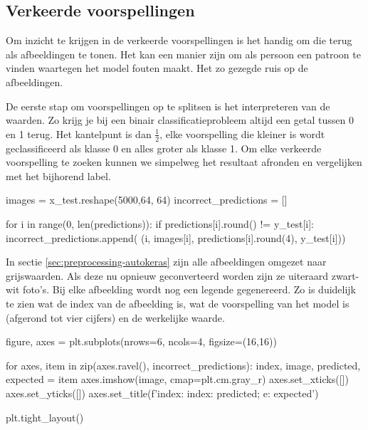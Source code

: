 \subsection{Verkeerde voorspellingen}
\label{subsec:wrong-predictions}

Om inzicht te krijgen in de verkeerde voorspellingen is het handig om die terug als afbeeldingen te tonen. Het kan een manier zijn om als persoon een patroon te vinden waartegen het model fouten maakt. Het zo gezegde ruis op de afbeeldingen. 

De eerste stap om voorspellingen op te splitsen is het interpreteren van de waarden. Zo krijg je bij een binair classificatieprobleem altijd een getal tussen 0 en 1 terug. Het kantelpunt is dan $\frac{1}{2}$, elke voorspelling die kleiner is wordt geclassificeerd als klasse 0 en alles groter als klasse 1. Om elke verkeerde voorspelling te zoeken kunnen we simpelweg het resultaat afronden en vergelijken met het bijhorend label.

\bigskip

\begin{python}
images = x_test.reshape(5000,64, 64)
incorrect_predictions = []

for i in range(0, len(predictions)):
    if predictions[i].round() != y_test[i]:
        incorrect_predictions.append(
            (i, images[i], predictions[i].round(4), y_test[i]))
\end{python}

In sectie \ref{sec:preprocessing-autokeras} zijn alle afbeeldingen omgezet naar grijswaarden. Als deze nu opnieuw geconverteerd worden zijn ze uiteraard zwart-wit foto's. Bij elke afbeelding wordt nog een legende gegenereerd. Zo is duidelijk te zien wat de index van de afbeelding is, wat de voorspelling van het model is (afgerond tot vier cijfers) en de werkelijke waarde.

\bigskip

\begin{python}

figure, axes = plt.subplots(nrows=6, ncols=4, figsize=(16,16))

for axes, item in zip(axes.ravel(), incorrect_predictions):
    index, image, predicted, expected = item
    axes.imshow(image, cmap=plt.cm.gray_r)
    axes.set_xticks([])
    axes.set_yticks([])
    axes.set_title(f'index: {index}\np: {predicted}; e: {expected}')
    
plt.tight_layout()
\end{python}

